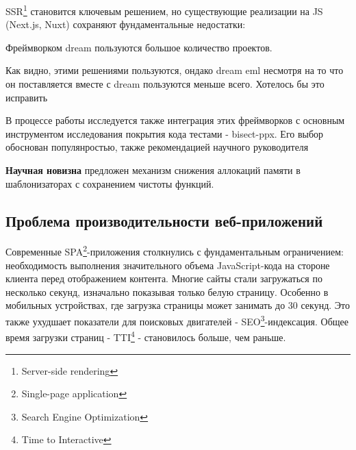 

SSR\footnote{Server-side rendering} становится ключевым решением, но существующие реализации на JS (Next.js, Nuxt) сохраняют фундаментальные недостатки:

Фреймворком dream пользуются большое количество проектов.

Как видно, этими решениями пользуются, ондако dream eml несмотря на то что он поставляется вместе с dream пользуются меньше всего.
Хотелось бы это исправить




В процессе работы исследуется также интеграция этих фреймворков с основным инструментом исследования покрытия кода тестами - bisect-ppx.
Его выбор обоснован популянростью, также рекомендацией научного руководителя


\textbf{Научная новизна} предложен механизм снижения аллокаций памяти в шаблонизаторах с сохранением чистоты функций.

\subsection{Проблема производительности веб-приложений}
Современные SPA\footnote{Single-page application}-приложения столкнулись с фундаментальным ограничением: необходимость выполнения значительного объема JavaScript-кода на стороне клиента перед отображением контента. %
Многие сайты стали загружаться по несколько секунд, изначально показывая только белую страницу. %
Особенно в мобильных устройствах, где загрузка страницы может занимать до 30 секунд. %
Это также ухудшает показатели для поисковых двигателей - SEO\footnote{Search Engine Optimization}-индексация. %
Общее время загрузки страниц - TTI\footnote{Time to Interactive} - становилось больше, чем раньше. %

